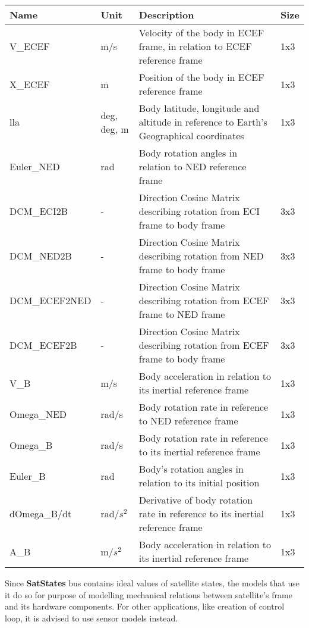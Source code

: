         \begin{table}[H]
            \begin{tabularx}{\textwidth}{llXl}
            \textbf{Name} & \textbf{Unit} & \textbf{Description} & \textbf{Size} \\ \hline
            V\_ECEF & m/s & Velocity of the body in ECEF frame, in relation to ECEF reference frame & 1x3 \\
            X\_ECEF & m & Position of the body in ECEF reference frame & 1x3 \\
            lla & deg, deg, m & Body latitude, longitude and altitude in reference to Earth's Geographical coordinates & 1x3 \\
            Euler\_NED & rad & Body rotation angles in relation to NED reference frame &  \\
            DCM\_ECI2B & - & Direction Cosine Matrix describing rotation from ECI frame to body frame & 3x3 \\
            DCM\_NED2B & - &  Direction Cosine Matrix describing rotation from NED frame to body frame & 3x3  \\
            DCM\_ECEF2NED & - & Direction Cosine Matrix describing rotation from ECEF frame to NED frame & 3x3  \\
            DCM\_ECEF2B & - &  Direction Cosine Matrix describing rotation from ECEF frame to body frame & 3x3  \\
            V\_B & m/s & Body acceleration in relation to its inertial reference frame &  1x3 \\
            Omega\_NED & rad/s & Body rotation rate in reference to NED reference frame & 1x3  \\
            Omega\_B & rad/s & Body rotation rate in reference to its inertial reference frame  & 1x3 \\
            Euler\_B & rad & Body's rotation angles in relation to its initial position  & 1x3 \\
            dOmega\_B/dt & rad/$s^2$ & Derivative of body rotation rate in reference to its inertial reference frame & 1x3 \\
            A\_B & m/$s^2$ & Body acceleration in relation to its inertial reference frame & 1x3 \\ \hline
            \end{tabularx}
        \end{table}
        

        Since \textbf{SatStates} bus contains ideal values of satellite states, the models that use it do so for purpose of modelling mechanical relations between satellite's frame and its hardware components. For other applications, like creation of control loop, it is advised to use sensor models instead.
